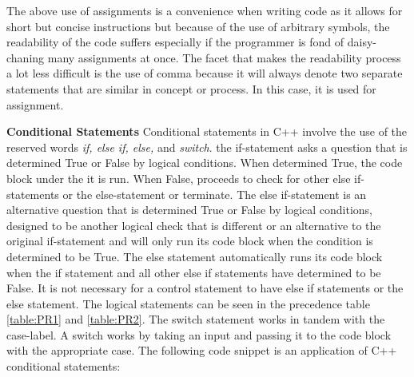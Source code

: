 \documentclass[12pt]{article}
\begin{document}
The above use of assignments is a convenience when writing code as it allows for short but concise instructions but because of the use of arbitrary symbols, the readability of the code suffers especially if the programmer is fond of daisy-chaning many assignments at once. The facet that makes the readability process a lot less difficult is the use of comma because it will always denote two separate statements that are similar in concept or process. In this case, it is used for assignment.

\textbf{Conditional Statements} Conditional statements in C++ involve the use of the reserved words \textit{if, else if, else,} and \textit{switch}. the if-statement asks a question that is determined True or False by logical conditions. When determined True, the code block under the it is run. When False, proceeds to check for other else if-statements or the else-statement or terminate. The else if-statement is an alternative question that is determined True or False by logical conditions, designed to be another logical check that is different or an alternative to the original if-statement and will only run its code block when the condition is determined to be True. The else statement automatically runs its code block when the if statement and all other else if statements have determined to be False. It is not necessary for a control statement to have else if statements or the else statement. The logical statements can be seen in the precedence table \ref{table:PR1} and \ref{table:PR2}. The switch statement works in tandem with the case-label. A switch works by taking an input and passing it to the code block with the appropriate case. The following code snippet is an application of C++ conditional statements:
\end{document}
